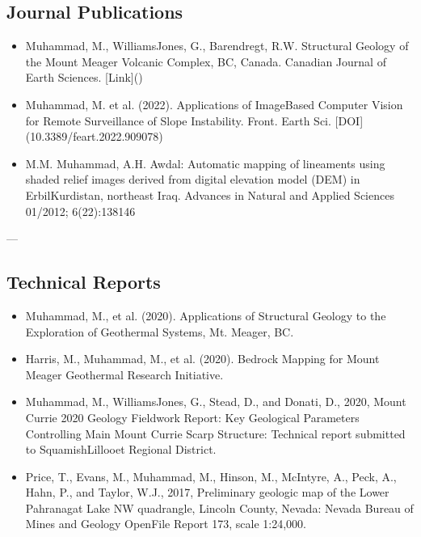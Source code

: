\documentclass[letterpaper,10pt,english]{sphinxmanual}
\begin{document}
\subsection{Journal Publications}
\label{\detokenize{CV_Mahmud_2023:journal-publications}}\begin{itemize}
\item {} 
\sphinxAtStartPar
Muhammad, M., Williams\sphinxhyphen{}Jones, G., Barendregt, R.W. Structural Geology of the Mount Meager Volcanic Complex, BC, Canada. Canadian Journal of Earth Sciences. {[}Link{]}()

\item {} 
\sphinxAtStartPar
Muhammad, M. et al. (2022). Applications of Image\sphinxhyphen{}Based Computer Vision for Remote Surveillance of Slope Instability. Front. Earth Sci. {[}DOI{]}(10.3389/feart.2022.909078)

\item {} 
\sphinxAtStartPar
M.M. Muhammad, A.H. Awdal: Automatic mapping of lineaments using shaded relief images derived from digital elevation model (DEM) in Erbil\sphinxhyphen{}Kurdistan, northeast Iraq. Advances in Natural and Applied Sciences 01/2012; 6(2\sphinxhyphen{}2):138\sphinxhyphen{}146

\end{itemize}

\sphinxAtStartPar
—


\subsection{Technical Reports}
\label{\detokenize{CV_Mahmud_2023:technical-reports}}\begin{itemize}
\item {} 
\sphinxAtStartPar
Muhammad, M., et al. (2020). Applications of Structural Geology to the Exploration of Geothermal Systems, Mt. Meager, BC.

\item {} 
\sphinxAtStartPar
Harris, M., Muhammad, M., et al. (2020). Bedrock Mapping for Mount Meager Geothermal Research Initiative.

\item {} 
\sphinxAtStartPar
Muhammad, M., Williams\sphinxhyphen{}Jones, G., Stead, D., and Donati, D., 2020, Mount Currie 2020 Geology Fieldwork Report: Key Geological Parameters Controlling Main Mount Currie Scarp Structure: Technical report submitted to Squamish\sphinxhyphen{}Lillooet Regional District.

\item {} 
\sphinxAtStartPar
Price, T., Evans, M., Muhammad, M., Hinson, M., McIntyre, A., Peck, A., Hahn, P., and Taylor, W.J., 2017, Preliminary geologic map of the Lower Pahranagat Lake NW quadrangle, Lincoln County, Nevada: Nevada Bureau of Mines and Geology Open\sphinxhyphen{}File Report 17\sphinxhyphen{}3, scale 1:24,000.

\end{itemize}
\end{document}
